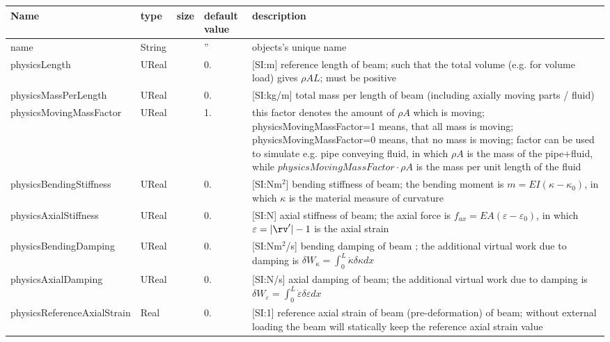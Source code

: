 \begin{center}
  \footnotesize
  \begin{longtable}{| p{4.5cm} | p{2.5cm} | p{0.5cm} | p{2.5cm} | p{6cm} |}
    \hline
    \bf Name & \bf type & \bf size & \bf default value & \bf description \\ \hline
    name &     String &      &     '' &     objects's unique name\\ \hline
    physicsLength &     UReal &      &     0. &      [SI:m] reference length of beam; such that the total volume (e.g. for volume load) gives $\rho A L$; must be positive\\ \hline
    physicsMassPerLength &     UReal &      &     0. &      [SI:kg/m] total mass per length of beam (including axially moving parts / fluid)\\ \hline
    physicsMovingMassFactor &     UReal &      &     1. &     this factor denotes the amount of $\rho A$ which is moving; physicsMovingMassFactor=1 means, that all mass is moving; physicsMovingMassFactor=0 means, that no mass is moving; factor can be used to simulate e.g. pipe conveying fluid, in which $\rho A$ is the mass of the pipe+fluid, while $physicsMovingMassFactor \cdot \rho A$ is the mass per unit length of the fluid\\ \hline
    physicsBendingStiffness &     UReal &      &     0. &      [SI:Nm$^2$] bending stiffness of beam; the bending moment is $m = EI (\kappa - \kappa_0)$, in which $\kappa$ is the material measure of curvature\\ \hline
    physicsAxialStiffness &     UReal &      &     0. &      [SI:N] axial stiffness of beam; the axial force is $f_{ax} = EA (\varepsilon -\varepsilon_0)$, in which $\varepsilon = |\rv^\prime|-1$ is the axial strain\\ \hline
    physicsBendingDamping &     UReal &      &     0. &      [SI:Nm$^2$/s] bending damping of beam ; the additional virtual work due to damping is $\delta W_{\dot \kappa} = \int_0^L \dot \kappa \delta \kappa dx$\\ \hline
    physicsAxialDamping &     UReal &      &     0. &      [SI:N/s] axial damping of beam; the additional virtual work due to damping is $\delta W_{\dot\varepsilon} = \int_0^L \dot \varepsilon \delta \varepsilon dx$\\ \hline
    physicsReferenceAxialStrain &     Real &      &     0. &      [SI:1] reference axial strain of beam (pre-deformation) of beam; without external loading the beam will statically keep the reference axial strain value\\ \hline

\end{longtable}
\end{center}
